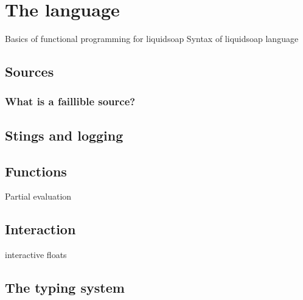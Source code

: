 \chapter{The language}
Basics of functional programming for liquidsoap
Syntax of liquidsoap language

\section{Sources}
\subsection{What is a faillible source?}

\section{Stings and logging}

\section{Functions}
Partial evaluation

\section{Interaction}
interactive floats

\section{The typing system}
